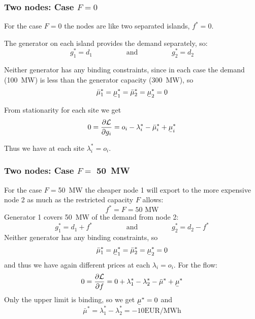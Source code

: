 \documentclass[10pt,aspectratio=169,dvipsnames]{beamer}
\def\l{\lambda}
\def\m{\mu}
\def\d{\partial}
\def\cL{\mathcal{L}}
\newcommand{\ubar}[1]{\text{\b{$#1$}}}
\begin{document}
\begin{frame}[fragile]
  \frametitle{Two nodes: Case $F = 0$ }

  For the case $F = 0$ the nodes are like two separated islands, $f^* = 0$.

  The generator on each island provides the demand separately, so:
  \begin{equation*}
    g_1^* = d_1  \hspace{2cm} \textrm{and} \hspace{2cm} g_2^* = d_2
  \end{equation*}

  Neither generator has any binding constraints, since in each case the demand (100~MW) is less than the generator capacity (300~MW), so
  \begin{equation*}
    \bar{\m}_1^* = \ubar{\m}_1^* =     \bar{\m}_2^* = \ubar{\m}_2^* = 0
  \end{equation*}

  From stationarity for each site we get
  \begin{equation*}
    0 = \frac{\d \cL}{\d g_{i}} = o_i - \l_i^*  -  \bar{\m}_i^* + \ubar{\m}_i^*
  \end{equation*}

  Thus we have at each site $\l_i^* = o_i$.


\end{frame}


\begin{frame}[fragile]
  \frametitle{Two nodes: Case $F =$ 50~MW }

  For the case $F = $50~MW the cheaper node 1 will export to the more
  expensive node 2 as much as the restricted capacity $F$ allows:
  \begin{equation*}
    f^* = F = 50\textrm{ MW}
  \end{equation*}
  Generator 1 covers 50~MW of the demand from node 2:
  \begin{equation*}
    g_1^* = d_1+f^*  \hspace{2cm} \textrm{and} \hspace{2cm} g_2^* = d_2 - f^*
  \end{equation*}
  Neither generator has any binding constraints, so
  \begin{equation*}
    \bar{\m}_1^* = \ubar{\m}_1^* =     \bar{\m}_2^* = \ubar{\m}_2^* = 0
  \end{equation*}
  and thus we have again different prices at each $\l_i = o_i$. For the flow:
  \begin{equation*}
    0 = \frac{\d \cL}{\d f} = 0 +  \l_1^* - \l_2^*  -  \bar{\m}^* + \ubar{\m}^*
  \end{equation*}
  Only the upper limit is binding, so we get $\ubar{\m}^* = 0$ and
  \begin{equation*}
    \bar{\m}^* = \l_1^* - \l_2^* = -10 \textrm{EUR/MWh}
  \end{equation*}


\end{frame}
\end{document}
